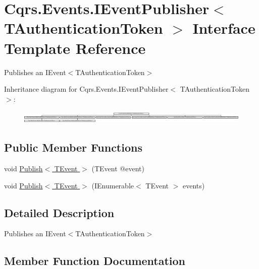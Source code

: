 \hypertarget{interfaceCqrs_1_1Events_1_1IEventPublisher}{}\section{Cqrs.\+Events.\+I\+Event\+Publisher$<$ T\+Authentication\+Token $>$ Interface Template Reference}
\label{interfaceCqrs_1_1Events_1_1IEventPublisher}


Publishes an I\+Event$<$\+T\+Authentication\+Token$>$  


Inheritance diagram for Cqrs.\+Events.\+I\+Event\+Publisher$<$ T\+Authentication\+Token $>$\+:\begin{figure}[H]
\begin{center}
\leavevmode
\includegraphics[height=0.633484cm]{interfaceCqrs_1_1Events_1_1IEventPublisher}
\end{center}
\end{figure}
\subsection*{Public Member Functions}
\begin{DoxyCompactItemize}
\item 
void \hyperlink{interfaceCqrs_1_1Events_1_1IEventPublisher_a02f0db0bc9b3aa1c7f766f58f8422ee3}{Publish$<$ T\+Event $>$} (T\+Event @event)
\item 
void \hyperlink{interfaceCqrs_1_1Events_1_1IEventPublisher_a2cbcc3d2c24d015abef6337714ec51ff}{Publish$<$ T\+Event $>$} (I\+Enumerable$<$ T\+Event $>$ events)
\end{DoxyCompactItemize}


\subsection{Detailed Description}
Publishes an I\+Event$<$\+T\+Authentication\+Token$>$ 



\subsection{Member Function Documentation}
\mbox{\label{interfaceCqrs_1_1Events_1_1IEventPublisher_a02f0db0bc9b3aa1c7f766f58f8422ee3}} 

